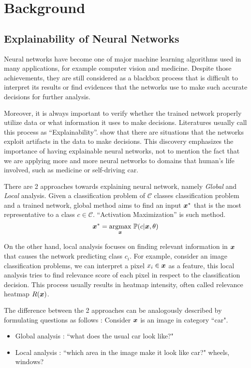 \chapter{Background\label{cha:chapter3}}


\section{Explainability of Neural Networks}
Neural networks have become one of major machine learning algorithms used in many applications, for example computer vision and medicine. Despite those achievements, they are still considered as a blackbox process that is  difficult to interpret its results or find evidences that the networks use to make such accurate decisions for further analysis.

Moreover, it is always important to verify whether the trained network properly utilize data or what information it uses to make decisions. Literatures usually call this process as ``Explainability''.  \cite{BachAnalyzingclassifiersFisher2016} show that there are situations that the networks exploit artifacts in the data to make decisions. This discovery emphasizes the importance of having explainable neural networks, not to mention the fact that we are applying more and more neural networks to domains that human's life involved, such as medicine or self-driving car.

There are 2 approaches towards explaining neural network, namely \textit{Global} and \textit{Local} analysis. Given a  classification problem of $\mathcal{C}$ classes classification problem and a trained network, global method aims to find an input $\patvector{x}^*$ that is the most representative to a class $c \in \mathcal{C}$. ``Activation Maximization\cite{ErhanUnderstandingRepresentationsLearned2010}'' is such method.
$$
\patvector{x}^*  = \patarg{max}{\patvector{x}}  \mathbb{P}( c |\patvector{x},\theta)
$$

On the other hand, local analysis focuses on finding relevant information in $\patvector{x}$ that causes the network predicting class $c_i$.  For example, consider an image classification problems, we can interpret a pixel $x_i \in \patvector{x}$ as a feature, this local analysis tries to find relevance score of each pixel in respect to the classification decision. This process usually results in heatmap intensity, often called relevance heatmap $R(\patvector{x})$.

The difference  between the 2 approaches can be analogously described by formulating questions as follows : Consider $\patvector{x}$ is an image in category ``car".
\begin{itemize}
	\item Global analysis : ``what does the usual car look like?"
    \item Local analysis : ``which area in the image make it look like car?" wheels, windows?
\end{itemize}

